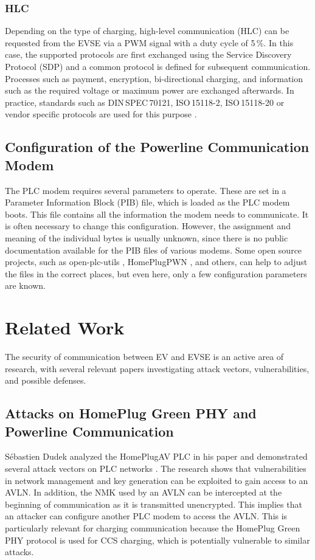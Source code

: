 \documentclass[sigconf]{acmart}
\begin{document}
\subsubsection{HLC}
Depending on the type of charging, high-level communication (HLC) can be requested from the EVSE via a PWM signal with a duty cycle of 5\,\%. In this case, the supported protocols are first exchanged using the Service Discovery Protocol (SDP) and a common protocol is defined for subsequent communication. Processes such as payment, encryption, bi-directional charging, and information such as the required voltage or maximum power are exchanged afterwards. In practice, standards such as DIN\,SPEC\,70121, ISO\,15118-2, ISO\,15118-20 or vendor specific protocols are used for this purpose \citep{vector-charging-standards}.

\subsection{Configuration of the Powerline Communication Modem}
The PLC modem requires several parameters to operate. These are set in a Parameter Information Block (PIB) file, which is loaded as the PLC modem boots. This file contains all the information the modem needs to communicate.
It is often necessary to change this configuration. However, the assignment and meaning of the individual bytes is usually unknown, since there is no public documentation available for the PIB files of various modems. Some open source projects, such as open-plc-utils \citep{qcaopen-plc-utils}, HomePlugPWN \citep{fluxiushomeplugpwn}, and others, can help to adjust the files in the correct places, but even here, only a few configuration parameters are known.

\section{Related Work}
The security of communication between EV and EVSE is an active area of research, with several relevant papers investigating attack vectors, vulnerabilities, and possible defenses.

\subsection{Attacks on HomePlug Green PHY and Powerline Communication}
Sébastien Dudek analyzed the HomePlugAV PLC in his paper and demonstrated several attack vectors on PLC networks \citep[pp.\,15--22]{dudek-homeplugav-2015}. The research shows that vulnerabilities in network management and key generation can be exploited to gain access to an AVLN. In addition, the NMK used by an AVLN can be intercepted at the beginning of communication as it is transmitted unencrypted. This implies that an attacker can configure another PLC modem to access the AVLN. This is particularly relevant for charging communication because the HomePlug Green PHY protocol is used for CCS charging, which is potentially vulnerable to similar attacks.
\end{document}
